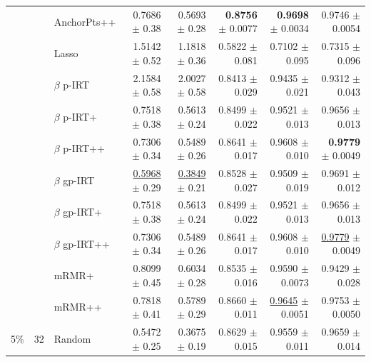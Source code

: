 \begin{longtable}{llp{}rrrrr}
 &  & AnchorPts++ & 0.7686 {\scriptsize $\pm$ 0.38} & 0.5693 {\scriptsize $\pm$ 0.28} & \textbf{0.8756} {\scriptsize $\pm$ 0.0077} & \textbf{0.9698} {\scriptsize $\pm$ 0.0034} & 0.9746 {\scriptsize $\pm$ 0.0054} \\
 &  & Lasso & 1.5142 {\scriptsize $\pm$ 0.52} & 1.1818 {\scriptsize $\pm$ 0.36} & 0.5822 {\scriptsize $\pm$ 0.081} & 0.7102 {\scriptsize $\pm$ 0.095} & 0.7315 {\scriptsize $\pm$ 0.096} \\
 &  & $\beta$ p-IRT & 2.1584 {\scriptsize $\pm$ 0.58} & 2.0027 {\scriptsize $\pm$ 0.58} & 0.8413 {\scriptsize $\pm$ 0.029} & 0.9435 {\scriptsize $\pm$ 0.021} & 0.9312 {\scriptsize $\pm$ 0.043} \\
 &  & $\beta$ p-IRT+ & 0.7518 {\scriptsize $\pm$ 0.38} & 0.5613 {\scriptsize $\pm$ 0.24} & 0.8499 {\scriptsize $\pm$ 0.022} & 0.9521 {\scriptsize $\pm$ 0.013} & 0.9656 {\scriptsize $\pm$ 0.013} \\
 &  & $\beta$ p-IRT++ & 0.7306 {\scriptsize $\pm$ 0.34} & 0.5489 {\scriptsize $\pm$ 0.26} & 0.8641 {\scriptsize $\pm$ 0.017} & 0.9608 {\scriptsize $\pm$ 0.010} & \textbf{0.9779} {\scriptsize $\pm$ 0.0049} \\
 &  & $\beta$ gp-IRT & \underline{0.5968} {\scriptsize $\pm$ 0.29} & \underline{0.3849} {\scriptsize $\pm$ 0.21} & 0.8528 {\scriptsize $\pm$ 0.027} & 0.9509 {\scriptsize $\pm$ 0.019} & 0.9691 {\scriptsize $\pm$ 0.012} \\
 &  & $\beta$ gp-IRT+ & 0.7518 {\scriptsize $\pm$ 0.38} & 0.5613 {\scriptsize $\pm$ 0.24} & 0.8499 {\scriptsize $\pm$ 0.022} & 0.9521 {\scriptsize $\pm$ 0.013} & 0.9656 {\scriptsize $\pm$ 0.013} \\
 &  & $\beta$ gp-IRT++ & 0.7306 {\scriptsize $\pm$ 0.34} & 0.5489 {\scriptsize $\pm$ 0.26} & 0.8641 {\scriptsize $\pm$ 0.017} & 0.9608 {\scriptsize $\pm$ 0.010} & \underline{0.9779} {\scriptsize $\pm$ 0.0049} \\
 &  & mRMR+ & 0.8099 {\scriptsize $\pm$ 0.45} & 0.6034 {\scriptsize $\pm$ 0.28} & 0.8535 {\scriptsize $\pm$ 0.016} & 0.9590 {\scriptsize $\pm$ 0.0073} & 0.9429 {\scriptsize $\pm$ 0.028} \\
 &  & mRMR++ & 0.7818 {\scriptsize $\pm$ 0.41} & 0.5789 {\scriptsize $\pm$ 0.29} & 0.8660 {\scriptsize $\pm$ 0.011} & \underline{0.9645} {\scriptsize $\pm$ 0.0051} & 0.9753 {\scriptsize $\pm$ 0.0050} \\
\midrule
5\% & 32 & Random & 0.5472 {\scriptsize $\pm$ 0.25} & 0.3675 {\scriptsize $\pm$ 0.19} & 0.8629 {\scriptsize $\pm$ 0.015} & 0.9559 {\scriptsize $\pm$ 0.011} & 0.9659 {\scriptsize $\pm$ 0.014} \\

\end{longtable}
